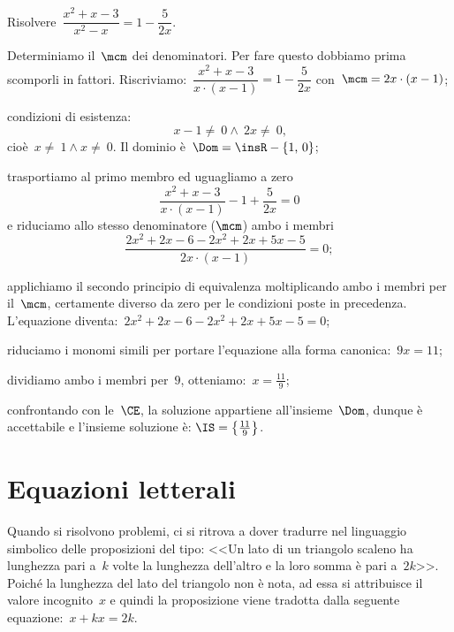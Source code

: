 \begin{exrig}
 \begin{esempio}
Risolvere~$\dfrac{x^{2}+x-3}{x^{2}-x}=1-\dfrac{5}{2x}$.
\end{esempio}

\begin{enumeratea}
 \item Determiniamo il~$\mcm$ dei denominatori. Per fare questo dobbiamo prima scomporli in fattori.
    Riscriviamo:~$\dfrac{x^{2}+x-3}{x\cdot (x-1)}=1-\dfrac{5}{2x}$ con~$\mcm=2x\cdot (x-1)$;
 \item condizioni di esistenza: \[x-1\neq~0\wedge~2x\neq~0\text{,}\] cioè~$x\neq~1\wedge x\neq~0$. Il dominio è~$\Dom=\insR-\{1\text{,~}0\}$;
 \item trasportiamo al primo membro ed uguagliamo a zero \[\frac{x^{2}+x-3}{x\cdot (x-1)}-1+\frac{5}{2x}=0\]
    e riduciamo allo stesso denominatore ($\mcm$) ambo i membri \[\frac{2x^{2}+2x-6-2x^{2}+2x+5x-5}{2x\cdot (x-1)}=0;\]
 \item applichiamo il secondo principio di equivalenza moltiplicando ambo i membri per il~$\mcm$,
    certamente diverso da zero per le condizioni poste in precedenza. L’equazione diventa:~$2x^{2}+2x-6-2x^{2}+2x+5x-5=0$;
 \item riduciamo i monomi simili per portare l’equazione alla forma canonica:~$9x=11$;
 \item dividiamo ambo i membri per~$9$, otteniamo:~$x=\frac{11}{9}$;
 \item confrontando con le~$\CE$, la soluzione appartiene all’insieme~$\Dom$, dunque è accettabile e l’insieme soluzione è:
    $\IS=\left\{\frac{11}{9}\right\}$.
\end{enumeratea}

\end{exrig}

\ovalbox{\risolvii \ref{ese:20.15}, \ref{ese:20.16}, \ref{ese:20.17}, \ref{ese:20.18}, \ref{ese:20.19}, \ref{ese:20.20}, \ref{ese:20.21},
\ref{ese:20.22}, \ref{ese:20.23}, \ref{ese:20.24}, \ref{ese:20.25}}

\vspazio\ovalbox{\ref{ese:20.26}, \ref{ese:20.27}}

\section{Equazioni letterali}
Quando si risolvono problemi, ci si ritrova a dover tradurre nel linguaggio simbolico delle proposizioni del tipo:
<<Un lato di un triangolo scaleno ha lunghezza pari a~$k$ volte la lunghezza dell’altro e la loro somma è pari a~$2k$>>.
Poiché la lunghezza del lato del triangolo non è nota, ad essa si attribuisce il valore incognito~$x$ e quindi la proposizione
viene tradotta dalla seguente equazione:~$x+kx=2k$.

